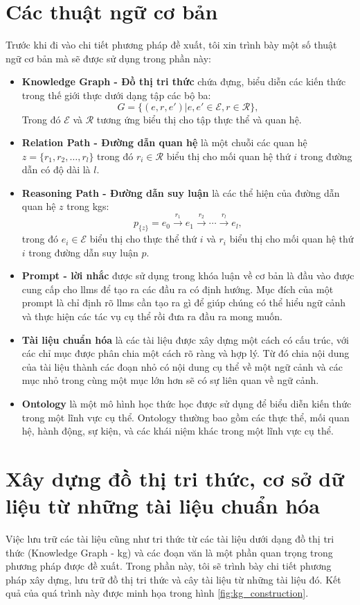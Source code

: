 \section{Các thuật ngữ cơ bản}
\label{section:terminology}
Trước khi đi vào chi tiết phương pháp đề xuất, tôi xin trình bày một số thuật ngữ cơ bản mà sẽ được sử dụng trong phần này:
\begin{itemize}
    \item \textbf{Knowledge Graph - Đồ thị tri thức} chứa đựng, biểu diễn các kiến thức trong thế giới thực dưới dạng tập các bộ ba: \[
              G = \{(e, r, e') | e, e' \in \mathcal{E}, r \in \mathcal{R}\},
          \]
          Trong đó $\mathcal{E}$ và $\mathcal{R}$ tương ứng biểu thị cho tập thực thể và quan hệ.


    \item \textbf{Relation Path - Đường dẫn quan hệ} là một chuỗi các quan hệ $z = \{r_1, r_2, \dots, r_l\}$ trong đó $r_i \in \mathcal{R}$ biểu thị cho mối quan hệ thứ $i$ trong đường dẫn có độ dài là $l$.
    \item \textbf{Reasoning Path - Đường dẫn suy luận} là các thể hiện của đường dẫn quan hệ $z$ trong \gls{kg}s: \[
              p_{\{z\}} = e_0 \xrightarrow{r_1} e_1 \xrightarrow{r_2} \cdots \xrightarrow{r_l} e_l,
          \] trong đó $e_i \in \mathcal{E}$ biểu thị cho thực thể thứ $i$ và $r_i$ biểu thị cho mối quan hệ thứ $i$ trong đường dẫn suy luận $p$.
    \item \textbf{Prompt - lời nhắc} được sử dụng trong khóa luận về cơ bản là đầu vào được cung cấp cho \gls{llm}s để tạo ra các đầu ra có định hướng. Mục đích của một prompt là chỉ định rõ \gls{llm}s cần tạo ra gì để giúp chúng có thể hiểu ngữ cảnh và thực hiện các tác vụ cụ thể rồi đưa ra đầu ra mong muốn.
    \item \textbf{Tài liệu chuẩn hóa} là các tài liệu được xây dựng một cách có cấu trúc, với các chỉ mục được phân chia một cách rõ ràng và hợp lý. Từ đó chia nội dung của tài liệu thành các đoạn nhỏ có nội dung cụ thể về một ngữ cảnh và các mục nhỏ trong cùng một mục lớn hơn sẽ có sự liên quan về ngữ cảnh.
    \item \textbf{Ontology} là một mô hình học thức học được sử dụng để biểu diễn kiến thức trong một lĩnh vực cụ thể. Ontology thường bao gồm các thực thể, mối quan hệ, hành động, sự kiện, và các khái niệm khác trong một lĩnh vực cụ thể.
\end{itemize}


\section{Xây dựng đồ thị tri thức, cơ sở dữ liệu từ những tài liệu chuẩn hóa}
\label{section:database_construction_method}
Việc lưu trữ các tài liệu cũng như tri thức từ các tài liệu dưới dạng đồ thị tri thức (Knowledge Graph - \gls{kg}) và các đoạn văn là một phần quan trọng trong phương pháp được đề xuất. Trong phần này, tôi sẽ trình bày chi tiết phương pháp xây dựng, lưu trữ đồ thị tri thức và cây tài liệu từ những tài liệu đó. Kết quả của quá trình này được minh họa trong hình \ref{fig:kg_construction}.



